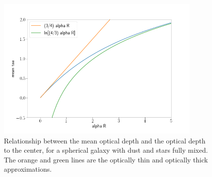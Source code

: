 \documentclass[11pt, preprint]{article}
\begin{document}
      \begin{figure}[h!]
        \includegraphics[width=0.9\textwidth]{tau-alphaR.png}
        \caption{ \label{fig:tau} Relationship between the mean
          optical depth and the optical depth to the center, for a
          spherical galaxy with dust and stars fully mixed. The orange
          and green lines are the optically thin and optically thick
          approximations.}
      \end{figure}
\end{document}
